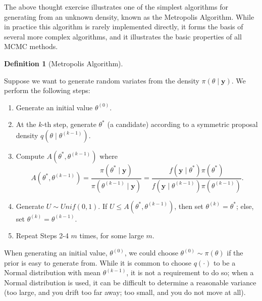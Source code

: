 \documentclass[
  letterpaper,
  DIV=11,
  numbers=noendperiod]{scrreprt}
\providecommand{\tightlist}{%
  \setlength{\itemsep}{0pt}\setlength{\parskip}{0pt}}\usepackage{longtable,booktabs,array}
\theoremstyle{definition}
\theoremstyle{definition}
\newtheorem{definition}{Definition}[chapter]
\theoremstyle{plain}
\theoremstyle{remark}
\begin{document}
The above thought exercise illustrates one of the simplest algorithms
for generating from an unknown density, known as the Metropolis
Algorithm. While in practice this algorithm is rarely implemented
directly, it forms the basis of several more complex algorithms, and it
illustrates the basic properties of all MCMC methods.

\begin{definition}[Metropolis
Algorithm]\protect\hypertarget{def-metropolis-algorithm}{}\label{def-metropolis-algorithm}

Suppose we want to generate random variates from the density
\(\pi(\theta \mid \mathbf{y})\). We perform the following steps:

\begin{enumerate}
\def\labelenumi{\arabic{enumi}.}
\tightlist
\item
  Generate an initial value \(\theta^{(0)}\).\\
\item
  At the \(k\)-th step, generate \(\theta^*\) (a candidate) according to
  a symmetric proposal density
  \(q\left(\theta \mid \theta^{(k-1)}\right)\).\\
\item
  Compute \(A\left(\theta^*, \theta^{(k-1)}\right)\) where
  \[A\left(\theta^*, \theta^{(k-1)}\right) = \frac{\pi\left(\theta^* \mid \mathbf{y}\right)}{\pi\left(\theta^{(k-1)} \mid \mathbf{y}\right)} = \frac{f\left(\mathbf{y} \mid \theta^*\right) \pi\left(\theta^*\right)}{f\left(\mathbf{y} \mid \theta^{(k-1)}\right) \pi\left(\theta^{(k-1)}\right)}.\]
\item
  Generate \(U \sim Unif(0,1)\). If
  \(U \leq A\left(\theta^*, \theta^{(k-1)}\right)\), then set
  \(\theta^{(k)} = \theta^*\); else, set
  \(\theta^{(k)} = \theta^{(k-1)}\).
\item
  Repeat Steps 2-4 \(m\) times, for some large \(m\).
\end{enumerate}

When generating an initial value, \(\theta^{(0)}\), we could choose
\(\theta^{(0)} \sim \pi(\theta)\) if the prior is easy to generate from.
While it is common to choose \(q(\cdot)\) to be a Normal distribution
with mean \(\theta^{(k-1)}\), it is not a requirement to do so; when a
Normal distribution is used, it can be difficult to determine a
reasonable variance (too large, and you drift too far away; too small,
and you do not move at all).

\end{definition}
\end{document}
